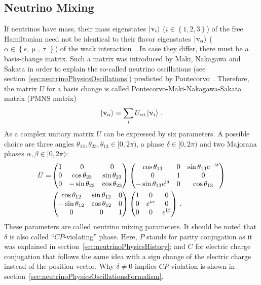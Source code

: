\subsection{Neutrino Mixing}
\label{sec:neutrinoPhysicsMassMechanismsMixing}
If neutrinos have mass, their mass eigenstates $\left|\upnu_i\right\rangle$ ($i \in \left\{1, 2, 3\right\}$) of the free Hamiltonian need not be identical to their flavor eigenstates $\left|\upnu_\alpha\right\rangle$ ($\alpha \in \left\{e,\upmu,\uptau\right\}$) of the weak interaction~\cite{zuber2011neutrino}. In case they differ, there must be a basis-change matrix. Such a matrix was introduced by Maki, Nakagawa and Sakata in order to explain the so-called neutrino oscillations (see section~\ref{sec:neutrinoPhysicsOscillations}) predicted by Pontecorvo~\cite{Pontecorvo1957, Maki1962}. Therefore, the matrix $U$ for a basis change is called Pontecorvo-Maki-Nakagawa-Sakata matrix (PMNS matrix)
\begin{equation}
\left|\upnu_\alpha\right\rangle = \sum_{i} U_{\alpha i} \left|\upnu_i\right\rangle
\text{\,.}
\end{equation}
As a complex unitary matrix $U$ can be expressed by six parameters. A possible choice are three angles $\theta_{12}, \theta_{23}, \theta_{13} \in [0,2\pi)$, a phase $\delta \in [0,2\pi)$ and two Majorana phases $\alpha, \beta \in [0,2\pi)$:
\begin{align}
\label{eq:PMNSmatrix}
U =  
&\begin{pmatrix} 
1 & 0 & 0 \\ 
0 & \cos\theta_{23} & \sin\theta_{23} \\ 
0 & -\sin\theta_{23} & \cos\theta_{23} 
\end{pmatrix}
\begin{pmatrix} 
\cos\theta_{13} & 0 & \sin\theta_{13}e^{-\mathrm{i}\delta} \\ 
0 & 1 & 0 \\ 
-\sin\theta_{13}e^{\mathrm{i}\delta} & 0 & \cos\theta_{13} 
\end{pmatrix} \\ \notag
&\begin{pmatrix} 
\cos\theta_{12} & \sin\theta_{12} & 0 \\ 
-\sin\theta_{12} & \cos\theta_{12} & 0 \\ 
0 & 0 & 1 
\end{pmatrix}
\begin{pmatrix} 
1 & 0 & 0 \\ 
0 & e^{\mathrm{i}\alpha} & 0 \\ 
0 & 0 & e^{\mathrm{i}\beta} 
\end{pmatrix}
\text{\,.}
\end{align}
These parameters are called neutrino mixing parameters. It should be noted that $\delta$ is also called ``$CP$-violating'' phase. Here, $P$ stands for parity conjugation as it was explained in section~\ref{sec:neutrinoPhysicsHistory}; and $C$ for electric charge conjugation that follows the same idea with a sign change of the electric charge instead of the position vector.  Why $\delta \neq 0$ implies $CP$-violation is shown in section~\ref{sec:neutrinoPhysicsOscillationsFormalism}.


